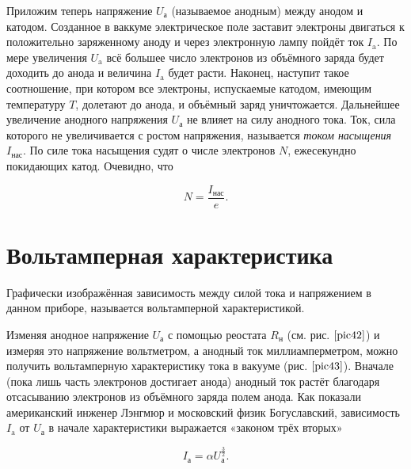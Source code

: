 \documentclass[a4paper,10pt]{book}
\begin{document}
Приложим теперь напряжение $U_\text{а}$ (называемое анодным) между анодом и катодом. Созданное в ваккуме электрическое поле заставит электроны двигаться к положительно заряженному аноду и через электронную лампу пойдёт ток $I_\text{a}$. По мере увеличения $U_\text{a}$ всё большее число электронов из объёмного заряда будет доходить до анода и величина $I_\text{a}$ будет расти. Наконец, наступит такое соотношение, при котором все электроны, испускаемые катодом, имеющим температуру $T$, долетают до анода, и объёмный заряд уничтожается. Дальнейшее увеличение анодного напряжения $U_\text{а}$ не влияет на силу анодного тока. Ток, сила которого не увеличивается с ростом напряжения, называется \emph{током насыщения} $I_\text{нас}$. По силе тока насыщения судят о числе электронов $N$, ежесекундно покидающих катод. Очевидно, что


\begin{equation}
N = \frac{I_\text{нас}}{e}.\nonumber
\end{equation}

\section{Вольтамперная характеристика}
Графически изображённая зависимость между силой тока и напряжением в данном приборе, называется вольтамперной характеристикой.

Изменяя анодное напряжение $U_\text{а}$ с помощью реостата $R_\text{н}$ (см. рис. $\ref{pic42}$) и измеряя это напряжение вольтметром, а анодный ток миллиамперметром, можно получить вольтамперную характеристику тока в вакууме (рис. $\ref{pic43}$). Вначале (пока лишь часть электронов достигает анода) анодный ток растёт благодаря отсасыванию электронов из объёмного заряда полем анода. Как показали американский инженер Лэнгмюр и московский физик Богуславский, зависимость $I_\text{a}$ от $U_\text{а}$ в начале характеристики выражается «законом трёх вторых»

\begin{equation}\label{zakon3/2}
I_\text{а} = \alpha U_\text{а}^{\frac{3}{2}}.
\end{equation}
\end{document}
